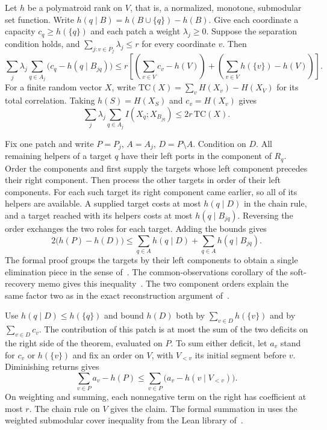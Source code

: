 \begin{theorem}
\label{thm:patch-credit}
Let \(h\) be a polymatroid rank on \(V\), that is, a normalized, monotone,
submodular set function. Write \(h(q\mid B)=h(B\cup\{q\})-h(B)\).
Give each coordinate a capacity \(c_q\ge h(\{q\})\) and each patch a
weight \(\lambda_j\ge0\). Suppose the separation condition holds, and
\(\sum_{j:v\in P_j}\lambda_j\le r\) for every coordinate \(v\). Then
\[
 \sum_j\lambda_j\sum_{q\in A_j}\bigl(c_q-h(q\mid B_{jq})\bigr)
 \le r\left[\left(\sum_{v\in V}c_v-h(V)\right)
              +\left(\sum_{v\in V}h(\{v\})-h(V)\right)\right].
\]
For a finite random vector \(X\), write
\(\mathrm{TC}(X)=\sum_v H(X_v)-H(X_V)\) for its total correlation.
Taking \(h(S)=H(X_S)\) and \(c_v=H(X_v)\) gives
\[
 \sum_j\lambda_j\sum_{q\in A_j} I(X_q;X_{B_{jq}})
 \le 2r\,\mathrm{TC}(X).
\]
\end{theorem}
\begin{outline}
Fix one patch and write \(P=P_j\), \(A=A_j\), \(D=P\setminus A\).
Condition on \(D\). All remaining helpers of a target \(q\) have their
left ports in the component of \(R_q\). Order the components and first
supply the targets whose left component precedes their right component.
Then process the other targets in order of their left components. For
each such target its right component came earlier, so all of its helpers
are available. A supplied target costs at most \(h(q\mid D)\) in the
chain rule, and a target reached with its helpers costs at most
\(h(q\mid B_{jq})\). Reversing the order exchanges the two roles for
each target. Adding the bounds gives
\[
 2\bigl(h(P)-h(D)\bigr)
 \le \sum_{q\in A} h(q\mid D)+\sum_{q\in A}h(q\mid B_{jq}).
\]
The formal proof groups the targets by their left components to obtain
a single elimination piece in the sense of~\cite{PaperSeven}. The
common-observations corollary of the soft-recovery memo gives this
inequality~\cite[Corollary~3.2]{SoftRecovery}. The two component orders explain the
same factor two as in the exact reconstruction argument
of~\cite[Lemma~4.1]{PaperFive}.

Use \(h(q\mid D)\le h(\{q\})\) and bound \(h(D)\) both by
\(\sum_{v\in D} h(\{v\})\) and by \(\sum_{v\in D} c_v\).
The contribution of this patch is at most the sum of the two deficits
on the right side of the theorem, evaluated on \(P\).
To sum either deficit, let \(a_v\) stand for \(c_v\) or \(h(\{v\})\)
and fix an order on \(V\), with \(V_{<v}\) its initial segment before
\(v\). Diminishing returns gives
\[
 \sum_{v\in P}a_v-h(P)\le\sum_{v\in P}
                   \bigl(a_v-h(v\mid V_{<v})\bigr).
\]
On weighting and summing, each nonnegative term on the right has
coefficient at most \(r\). The chain rule on \(V\) gives the claim.
The formal summation in 
uses the weighted submodular cover inequality from the Lean library
of~\cite{PaperTwo}.
\end{outline}

